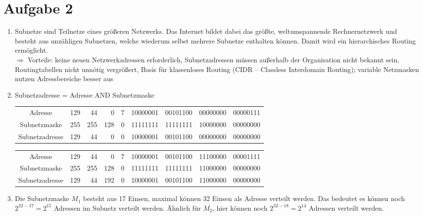 \documentclass{article}
\begin{document}
	\section*{Aufgabe 2}
	\begin{enumerate}[label=(\alph*)]
		\item Subnetze sind Teilnetze eines größeren Netzwerks. Das Internet bildet dabei das größte, weltumspannende Rechnernetzwerk und besteht aus unzähligen Subnetzen, welche wiederum selbst mehrere Subnetze enthalten können. Damit wird ein hierarchisches Routing ermöglicht. \\
		$\Rightarrow$ Vorteile: keine neuen Netzwerkadressen erforderlich, Subnetzadressen müssen außerhalb der Organisation nicht bekannt sein, Routingtabellen nicht unnötig vergrößert, Basis für klassenloses Routing (CIDR – Classless Interdomain Routing); variable Netzmasken nutzen Adressbereiche besser aus
		\item Subnetzadresse = Adresse AND Subnetzmaske
		\begin{center}
			\begin{tabular}{cr|r|r|r||c|c|c|c}
				Adresse & 129 & 44 & 0 & 7 & 10000001 & 00101100 & 00000000 & 00000111 \\
				Subnetzmaske & 255 & 255 & 128 & 0 & 11111111 & 11111111 & 10000000 & 00000000 \\
				\hline
				Subnetzadresse & 129 & 44 & 0 & 0 & 10000001 & 00101100 & 00000000 & 00000000
			\end{tabular}
		\end{center}
		\begin{center}
			\begin{tabular}{cr|r|r|r||c|c|c|c}
				Adresse & 129 & 44 & 0 & 7 & 10000001 & 00101100 & 11100000 & 00001111 \\
				Subnetzmaske & 255 & 255 & 128 & 0 & 11111111 & 11111111 & 11000000 & 00000000 \\
				\hline
				Subnetzadresse & 129 & 44 & 192 & 0 & 10000001 & 00101100 & 11000000 & 00000000
			\end{tabular}
		\end{center}
		\item Die Subnetzmaske $M_1$ besteht aus 17 Einsen, maximal können 32 Einsen als Adresse verteilt werden. Das bedeutet es können noch $2^{32-17}=2^{15}$ Adressen im Subnetz verteilt werden. Ähnlich für $M_2$, hier können noch $2^{32-18}=2^{14}$ Adressen verteilt werden.
	\end{enumerate}
\end{document}
